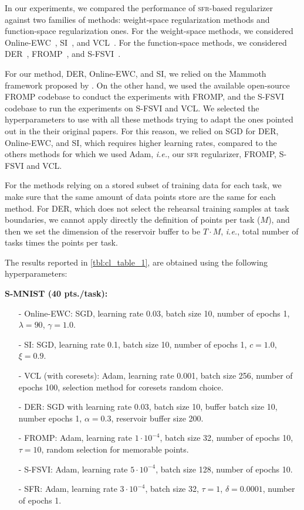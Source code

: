 \documentclass{article}
\makeatletter
\newcommand{\ie}{\textit{i.e.\@}\xspace}
\newcommand{\our}{\textsc{sfr}\xspace}
\makeatother
\begin{document}
In our experiments, we compared the performance of \our-based regularizer against two families of methods: weight-space regularization methods and function-space regularization ones.
For the weight-space methods, we considered Online-EWC~\citep{schwarz2018progress}, SI~\citep{zenke2017continual}, and VCL~\citep{nguyen2018variational}.  %
For the function-space methods, we considered DER~\citep{buzzega2020dark}, FROMP~\citep{pan2020continual}, and S-FSVI~\citep{rudner2022continual}.

For our method, DER, Online-EWC, and SI, we relied on the Mammoth framework proposed by \citep{buzzega2020dark}. On the other hand, we used the available open-source FROMP codebase to conduct the experiments with FROMP, and the S-FSVI codebase to run the experiments on S-FSVI and VCL. We selected the hyperparameters to use with all these methods trying to adapt the ones pointed out in the their original papers. For this reason, we relied on SGD for DER, Online-EWC, and SI, which requires higher learning rates, compared to the others methods for which we used Adam, \ie, our \our regularizer, FROMP, S-FSVI and VCL.

For the methods relying on a stored subset of training data for each task, we make sure that the same amount of data points store are the same for each method. For DER, which does not select the rehearsal training samples at task boundaries, we cannot apply directly the definition of points per task ($M$), and then we set the dimension of the reservoir buffer to be $T \cdot M$, \ie, total number of tasks times the points per task.

The results reported in \cref{tbl:cl_table_1}, are obtained using the following hyperparameters:
 
\textbf{S-MNIST (40 pts./task):}
\begin{itemize}
	\item[-] Online-EWC: SGD, learning rate $0.03$, batch size  10, number of epochs 1, $\lambda=90$, $\gamma=1.0$.
	\item[-] SI: SGD, learning rate 0.1, batch size 10, number of epochs 1, $c=1.0$, $\xi=0.9$.
	\item[-] VCL (with coresets): Adam, learning rate 0.001, batch size 256, number of epochs 100, selection method for coresets random choice.
	\item[-] DER: SGD with learning rate 0.03, batch size 10, buffer batch size 10, number epochs 1, $\alpha=0.3$, reservoir buffer size 200.
	\item[-] FROMP: Adam, learning rate $1 \cdot 10^{-4}$, batch size 32, number of epochs 10, $\tau = 10$, random selection for memorable points.
	\item[-] S-FSVI: Adam, learning rate $5 \cdot 10^{-4}$, batch size 128, number of epochs 10.
	\item[-] SFR: Adam, learning rate $3 \cdot 10^{-4}$, batch size 32, $\tau=1$, $\delta=0.0001$,  number of epochs 1.
\end{itemize}
\end{document}
